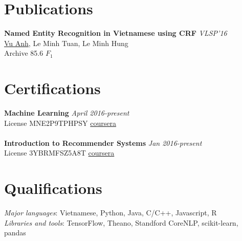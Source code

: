 \documentclass[11pt,a4paper,sans]{article}
\begin{document}
\section*{Publications}

\textbf{Named Entity Recognition in Vietnamese using CRF}
\hfill
\textit{VLSP'16} \\
\underline{Vu Anh}, Le Minh Tuan, Le Minh Hung
\\
Archive 85.6 $F_{1}$

\section*{Certifications}

\textbf{Machine Learning}
\hfill
\textit{April 2016-present} \\
License MNE2P9TPHPSY
\hfill
\href{https://www.coursera.org/account/accomplishments/verify/MNE2P9TPHPSY}{coursera} 
\\\\
\textbf{Introduction to Recommender Systems}
\hfill
\textit{Jan 2016-present} \\
License 3YBRMFSZ5A8T
\hfill
\href{https://www.coursera.org/account/accomplishments/verify/3YBRMFSZ5A8T}{coursera} 

\section*{Qualifications}

\textit{Major languages}: Vietnamese, Python, Java, C/C++, Javascript, R
\\
\textit{Libraries and tools}: TensorFlow, Theano, Standford CoreNLP, scikit-learn, pandas
\end{document}
